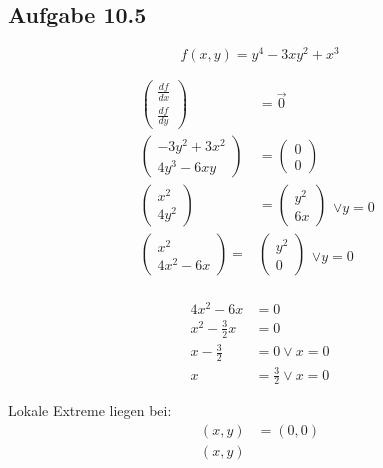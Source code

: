 \documentclass{standalone}
\begin{document}
\subsection{Aufgabe 10.5}

$$ f(x,y) = y^4 - 3xy^2 + x^3 $$

\begin{align}
    \begin{pmatrix}
        \frac{df}{dx} \\
        \frac{df}{dy}
    \end{pmatrix}
    &= \vec{0}\\
    \begin{pmatrix}
        -3y^2 + 3x^2 \\
        4y^3 - 6xy
    \end{pmatrix}
    &= \begin{pmatrix}
        0 \\
        0
    \end{pmatrix} \\
    \begin{pmatrix}
        x^2 \\
        4y^2
    \end{pmatrix}
    &= \begin{pmatrix}
        y^2 \\
        6x
    \end{pmatrix}
    \begin{matrix}
        \\
        \vee y = 0
    \end{matrix} \\
    \begin{pmatrix}
        x^2 \\
        4x^2 - 6x 
    \end{pmatrix}
    =& \begin{pmatrix}
        y^2 \\
        0
    \end{pmatrix}
    \begin{matrix}
        \\
        \vee y = 0
    \end{matrix} \\
\end{align}

\begin{align}
    4x^2 - 6 x &= 0 \\
    x^2 - \frac{3}{2} x &= 0 \\
    x - \frac{3}{2} &= 0 \vee x = 0 \\
    x &= \frac{3}{2} \vee x = 0
\end{align}

Lokale Extreme liegen bei:
\begin{align}
    (x,y) &= (0,0) \\
    (x,y)
\end{align}
\end{document}
